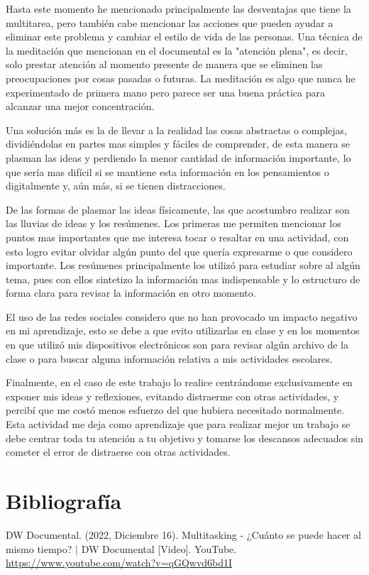 \documentclass[12pt, titlepage]{article}
\begin{document}
    Hasta este momento he mencionado principalmente las desventajas que tiene la multitarea, pero también cabe mencionar las acciones que pueden ayudar a eliminar este problema y cambiar el estilo de vida de las personas. Una técnica de la meditación que mencionan en el documental es la "atención plena", es decir, solo prestar atención al momento presente de manera que se eliminen las preocupaciones por cosas pasadas o futuras. La meditación es algo que nunca he experimentado de primera mano pero parece ser una buena práctica para alcanzar una mejor concentración. 
    
    Una solución más es la de llevar a la realidad las cosas abstractas o complejas, dividiéndolas en partes mas simples y fáciles de comprender, de esta manera se plasman las ideas y perdiendo la menor cantidad de información importante, lo que sería mas difícil si se mantiene esta información en los pensamientos o digitalmente y, aún más, si se tienen distracciones.

    De las formas de plasmar las ideas físicamente, las que acostumbro realizar son las lluvias de ideas y los resúmenes. Los primeras me permiten mencionar los puntos mas importantes que me interesa tocar o resaltar en una actividad, con esto logro evitar olvidar algún punto del que quería expresarme o que considero importante. Los resúmenes principalmente los utilizó para estudiar sobre al algún tema, pues con ellos sintetizo la información mas indispensable y lo estructuro de forma clara para revisar la información en otro momento.
    
    El uso de las redes sociales considero que no han provocado un impacto negativo en mi aprendizaje, esto se debe a que evito utilizarlas en clase y en los momentos en que utilizó mis dispositivos electrónicos son para revisar algún archivo de la clase o para buscar alguna información relativa a mis actividades escolares.

    Finalmente, en el caso de este trabajo lo realice centrándome exclusivamente en exponer mis ideas y reflexiones, evitando distraerme con otras actividades, y percibí que me costó menos esfuerzo del que hubiera necesitado normalmente. Esta actividad me deja como aprendizaje que para realizar mejor un trabajo se debe centrar toda tu atención a tu objetivo y tomarse los descansos adecuados sin cometer el error de distraerse con otras actividades.

    \section*{Bibliografía}
    \noindent DW Documental. (2022, Diciembre 16). Multitasking - ¿Cuánto se puede hacer al mismo tiempo? $|$ DW Documental [Video]. YouTube. \\
    \url{https://www.youtube.com/watch?v=qGQwvd6bd1I}
\end{document}
